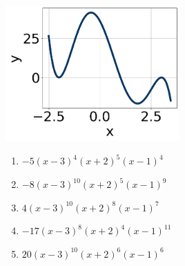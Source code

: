 \documentclass[14pt]{extbook}
\begin{document}
\begin{enumerate}
{\begin{center}
    \includegraphics[width=0.5\textwidth]{../Figures/polyGraphToFunctionCopyA.png}
\end{center}
\begin{enumerate}[label=\Alph*.]
\item \( -5(x - 3)^{4} (x + 2)^{5} (x - 1)^{4} \)
\item \( -8(x - 3)^{10} (x + 2)^{5} (x - 1)^{9} \)
\item \( 4(x - 3)^{10} (x + 2)^{8} (x - 1)^{7} \)
\item \( -17(x - 3)^{8} (x + 2)^{4} (x - 1)^{11} \)
\item \( 20(x - 3)^{10} (x + 2)^{6} (x - 1)^{6} \)


\end{enumerate}}
\end{enumerate}
\end{document}
